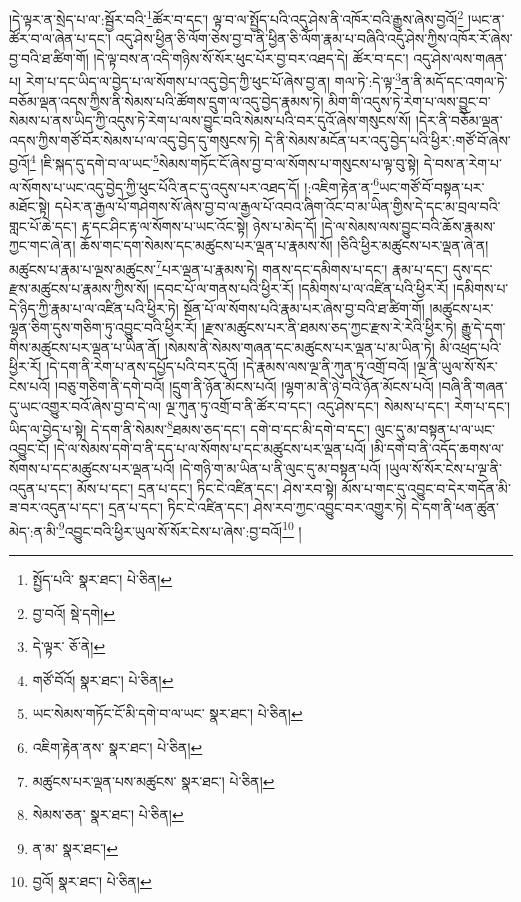 །དེ་ལྟར་ན་སྲེད་པ་ལ་:སྦྱོར་བའི་\footnote{སྤྱོད་པའི་  སྣར་ཐང་།  པེ་ཅིན། }ཚོར་བ་དང་། ལྟ་བ་ལ་སྤྱོད་པའི་འདུ་ཤེས་ནི་འཁོར་བའི་རྒྱུས་ཞེས་བྱའོ།\footnote{བྱ་བའོ།  སྡེ་དགེ། } །ཡང་ན་ཚོར་བ་ལ་ཞེན་པ་དང་། འདུ་ཤེས་ཕྱིན་ཅི་ལོག་ཅེས་བྱ་བ་ནི་ཕྱིན་ཅི་ལོག་རྣམ་པ་བཞིའི་འདུ་ཤེས་ཀྱིས་འཁོར་རོ་ཞེས་བྱ་བའི་ཐ་ཚིག་གོ། །དེ་ལྟ་བས་ན་འདི་གཉིས་སོ་སོར་ཕུང་པོར་བྱ་བར་འཐད་དེ། ཚོར་བ་དང་། འདུ་ཤེས་ལས་གཞན་པ། རེག་པ་དང་ཡིད་ལ་བྱེད་པ་ལ་སོགས་པ་འདུ་བྱེད་ཀྱི་ཕུང་པོ་ཞེས་བྱ་ན། གལ་ཏེ་:དེ་ལྟ་\footnote{དེ་ལྟར་  ཅོ་ནེ། }ན་ནི་མདོ་དང་འགལ་ཏེ་བཅོམ་ལྡན་འདས་ཀྱིས་ནི་སེམས་པའི་ཚོགས་དྲུག་ལ་འདུ་བྱེད་རྣམས་ཏེ། མིག་གི་འདུས་ཏེ་རེག་པ་ལས་བྱུང་བ་སེམས་པ་ནས་ཡིད་ཀྱི་འདུས་ཏེ་རེག་པ་ལས་བྱུང་བའི་སེམས་པའི་བར་དུའོ་ཞེས་གསུངས་སོ། །དེར་ནི་བཅོམ་ལྡན་འདས་ཀྱིས་གཙོ་བོར་སེམས་པ་ལ་འདུ་བྱེད་དུ་གསུངས་ཏེ། དེ་ནི་སེམས་མངོན་པར་འདུ་བྱེད་པའི་ཕྱིར་:གཙོ་བོ་ཞེས་བྱའོ།\footnote{གཙོ་བོའོ།  སྣར་ཐང་།  པེ་ཅིན། } །ཇི་སྐད་དུ་དགེ་བ་ལ་ཡང་\footnote{ཡང་སེམས་གཏོང་ངོ་མི་དགེ་བ་ལ་ཡང་  སྣར་ཐང་།  པེ་ཅིན། }སེམས་གཏོང་ངོ་ཞེས་བྱ་བ་ལ་སོགས་པ་གསུངས་པ་ལྟ་བུ་སྟེ། དེ་བས་ན་རེག་པ་ལ་སོགས་པ་ཡང་འདུ་བྱེད་ཀྱི་ཕུང་པོའི་ནང་དུ་འདུས་པར་འཐད་དོ། །:འཇིག་རྟེན་ན་\footnote{འཇིག་རྟེན་ནས་  སྣར་ཐང་།  པེ་ཅིན། }ཡང་གཙོ་བོ་བསྟན་པར་མཐོང་སྟེ། དཔེར་ན་རྒྱལ་པོ་གཤེགས་སོ་ཞེས་བྱ་བ་ལ་རྒྱལ་པོ་འབའ་ཞིག་འོང་བ་མ་ཡིན་གྱིས་དེ་དང་མ་བྲལ་བའི་གླང་པོ་ཆེ་དང་། རྟ་དང་ཤིང་རྟ་ལ་སོགས་པ་ཡང་འོང་སྟེ། ཉེས་པ་མེད་དོ། །དེ་ལ་སེམས་ལས་བྱུང་བའི་ཆོས་རྣམས་ཀྱང་གང་ཞེ་ན། ཆོས་གང་དག་སེམས་དང་མཚུངས་པར་ལྡན་པ་རྣམས་སོ། །ཅིའི་ཕྱིར་མཚུངས་པར་ལྡན་ཞེ་ན། མཚུངས་པ་རྣམ་པ་ལྔས་མཚུངས་\footnote{མཚུངས་པར་ལྡན་པས་མཚུངས་  སྣར་ཐང་།  པེ་ཅིན། }པར་ལྡན་པ་རྣམས་ཏེ། གནས་དང་དམིགས་པ་དང་། རྣམ་པ་དང་། དུས་དང་རྫས་མཚུངས་པ་རྣམས་ཀྱིས་སོ། །དབང་པོ་ལ་གནས་པའི་ཕྱིར་རོ། །དམིགས་པ་ལ་འཛིན་པའི་ཕྱིར་རོ། །དམིགས་པ་དེ་ཉིད་ཀྱི་རྣམ་པ་ལ་འཛིན་པའི་ཕྱིར་ཏེ། སྔོན་པོ་ལ་སོགས་པའི་རྣམ་པར་ཞེས་བྱ་བའི་ཐ་ཚིག་གོ། །མཚུངས་པར་ལྷན་ཅིག་དུས་གཅིག་ཏུ་འབྱུང་བའི་ཕྱིར་རོ། །རྫས་མཚུངས་པར་ནི་ཐམས་ཅད་ཀྱང་རྫས་རེ་རེའི་ཕྱིར་ཏེ། རྒྱུ་དེ་དག་གིས་མཚུངས་པར་ལྡན་པ་ཡིན་ནོ། །སེམས་ནི་སེམས་གཞན་དང་མཚུངས་པར་ལྡན་པ་མ་ཡིན་ཏེ། མི་འཕྲད་པའི་ཕྱིར་རོ། །དེ་དག་ནི་རེག་པ་ནས་དཔྱོད་པའི་བར་དུའོ། །དེ་རྣམས་ལས་ལྔ་ནི་ཀུན་ཏུ་འགྲོ་བའོ། །ལྔ་ནི་ཡུལ་སོ་སོར་ངེས་པའོ། །བཅུ་གཅིག་ནི་དགེ་བའོ། །དྲུག་ནི་ཉོན་མོངས་པའོ། །ལྷག་མ་ནི་ཉེ་བའི་ཉོན་མོངས་པའོ། །བཞི་ནི་གཞན་དུ་ཡང་འགྱུར་བའོ་ཞེས་བྱ་བ་དེ་ལ། ལྔ་ཀུན་ཏུ་འགྲོ་བ་ནི་ཚོར་བ་དང་། འདུ་ཤེས་དང་། སེམས་པ་དང་། རེག་པ་དང་། ཡིད་ལ་བྱེད་པ་སྟེ། དེ་དག་ནི་སེམས་\footnote{སེམས་ཅན་  སྣར་ཐང་།  པེ་ཅིན། }ཐམས་ཅད་དང་། དགེ་བ་དང་མི་དགེ་བ་དང་། ལུང་དུ་མ་བསྟན་པ་ལ་ཡང་འབྱུང་ངོ། །དེ་ལ་སེམས་དགེ་བ་ནི་དད་པ་ལ་སོགས་པ་དང་མཚུངས་པར་ལྡན་པའོ། །མི་དགེ་བ་ནི་འདོད་ཆགས་ལ་སོགས་པ་དང་མཚུངས་པར་ལྡན་པའོ། །དེ་གཉི་ག་མ་ཡིན་པ་ནི་ལུང་དུ་མ་བསྟན་པའོ། །ཡུལ་སོ་སོར་ངེས་པ་ལྔ་ནི་འདུན་པ་དང་། མོས་པ་དང་། དྲན་པ་དང་། ཏིང་ངེ་འཛིན་དང་། ཤེས་རབ་སྟེ། མོས་པ་གང་དུ་འབྱུང་བ་དེར་གདོན་མི་ཟ་བར་འདུན་པ་དང་། དྲན་པ་དང་། ཏིང་ངེ་འཛིན་དང་། ཤེས་རབ་ཀྱང་འབྱུང་བར་འགྱུར་ཏེ། དེ་དག་ནི་ཕན་ཚུན་མེད་:ན་མི་\footnote{ན་མ་  སྣར་ཐང་། }འབྱུང་བའི་ཕྱིར་ཡུལ་སོ་སོར་ངེས་པ་ཞེས་:བྱ་བའོ།\footnote{བྱའོ།  སྣར་ཐང་།  པེ་ཅིན། } །
